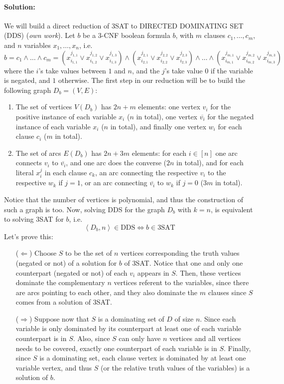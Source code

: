 \documentclass{amsart}
\theoremstyle{plain}
\begin{document}
\paragraph{\textbf{Solution:}}
We will build a direct reduction of 3SAT to DIRECTED DOMINATING SET (DDS) (\textit{own work}). \newline
Let $b$ be a $3$-CNF boolean formula $b$, with $m$ clauses $c_1, \dots, c_m$, and
 $n$ variables $x_1, \dots, x_n$, i.e.
 \[
  b = c_1 \land \dots \land c_m =
   \left(x_{i_{1,1}}^{j_{1,1}} \lor x_{i_{1,2}}^{j_{1,2}} \lor x_{i_{1,3}}^{j_{1,3}}\right) \land
   \left(x_{i_{2,1}}^{j_{2,1}} \lor x_{i_{2,2}}^{j_{2,2}} \lor x_{i_{2,3}}^{j_{2,3}}\right) \land
   \dots \land
   \left(x_{i_{m,1}}^{j_{m,1}} \lor x_{i_{m,2}}^{j_{m,2}} \lor x_{i_{m,3}}^{j_{m,3}}\right)
 \]
 where the $i$'s take values between $1$ and $n$, and the $j$'s take value $0$ if the variable is negated, and $1$ otherwise. \newline
The first step in our reduction will be to build the following graph $D_b = (V,E)$:
\begin{enumerate}
 \item The set of vertices $V(D_b)$ has $2n + m$ elements: one vertex $v_i$ for the positive instance of each variable $x_i$
  ($n$ in total), one vertex $\overline{v_i}$ for the negated instance of each variable $x_i$ ($n$ in total), and
  finally one vertex $w_i$ for each clause $c_i$ ($m$ in total).
 \item The set of arcs $E(D_b)$ has $2n + 3m$ elements: for each $i \in [n]$ one arc connects $v_i$ to $\overline{v_i}$, and
  one arc does the converse ($2n$ in total), and for each literal $x_i^j$ in each clause $c_k$, an arc connecting
  the respective $v_i$ to the respective $w_k$ if $j = 1$, or an arc connecting $\overline{v_i}$ to $w_k$ if $j = 0$ ($3m$ in total).
\end{enumerate}
Notice that the number of vertices is polynomial, and thus the construction of such a graph is too.
Now, solving DDS for the graph $D_b$ with $k = n$, is equivalent to solving 3SAT for $b$, i.e.
\[
 \left< D_b,n \right> \in \text{DDS} \Leftrightarrow b \in \text{3SAT}
\]
Let's prove this:
\begin{itemize}
 \item[($\Leftarrow$)] Choose $S$ to be the set of $n$ vertices corresponding the truth values (negated or not) of a solution
   for $b$ of 3SAT.
  Notice that one and only one counterpart (negated or not) of each $v_i$ appears in $S$.
  Then, these vertices dominate the complementary $n$ vertices referent to the variables, since there are arcs pointing to each other,
   and they also dominate the $m$ clauses since $S$ comes from a solution of 3SAT.
 \item[($\Rightarrow$)] Suppose now that $S$ is a dominating set of $D$ of size $n$.
  Since each variable is only dominated by its counterpart at least one of each variable counterpart is in $S$.
  Also, since $S$ can only have $n$ vertices and all vertices needs to be covered, exactly one counterpart of each variable is in $S$.
  Finally, since $S$ is a dominating set, each clause vertex is dominated by at least one variable vertex, and thus
  $S$ (or the relative truth values of the variables) is a solution of $b$.
\end{itemize}
\end{document}
